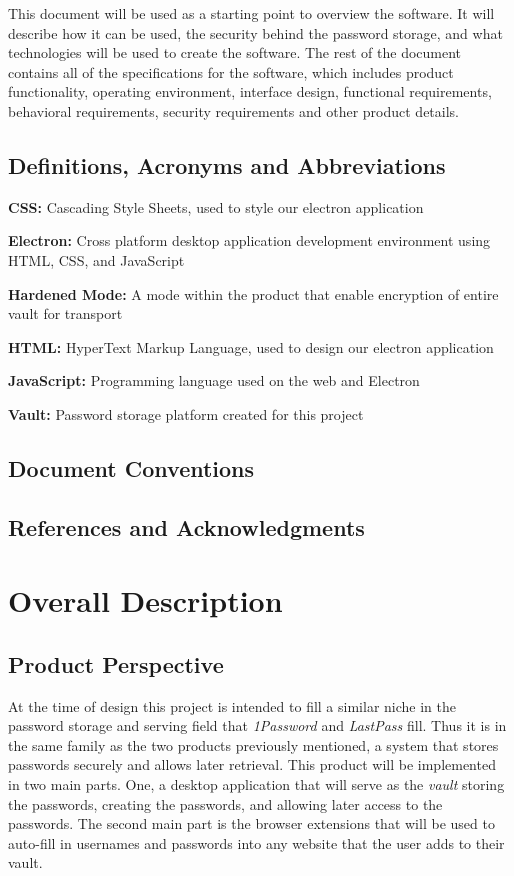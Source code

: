 \documentclass{report}
\begin{document}
This document will be used as a starting point to overview the
software. It will describe how it can be used, the security behind the
password storage, and what technologies will be used to create the software.
The rest of the document contains all of the specifications for the
software, which includes product functionality, operating environment,
interface design, functional requirements, behavioral requirements, 
security requirements and other product details.
\section{Definitions, Acronyms and Abbreviations}
\textbf{CSS:} Cascading Style Sheets, used to style our electron application

\textbf{Electron:} Cross platform desktop application development environment
using HTML, CSS, and JavaScript

\textbf{Hardened Mode:} A mode within the product that enable encryption of entire
vault for transport

\textbf{HTML:} HyperText Markup Language, used to design our electron application

\textbf{JavaScript:} Programming language used on the web and Electron

\textbf{Vault:} Password storage platform created for this project

\section{Document Conventions}

\section{References and Acknowledgments}

    \printbibliography[heading=none]



\chapter{Overall Description}

\section{Product Perspective}
At the time of design this project is intended to fill a similar
niche in the password storage and serving field that \textit{1Password}
and \textit{LastPass} fill. Thus it is in the same family as
the two products previously mentioned, a system that stores passwords
securely and allows later retrieval. This product will be implemented in
two main parts. One, a desktop application that will serve as the \textit{vault}
storing the passwords, creating the passwords, and allowing later access
to the passwords. The second main part is the browser extensions that
will be used to auto-fill in usernames and passwords into any website
that the user adds to their vault. 
\end{document}
